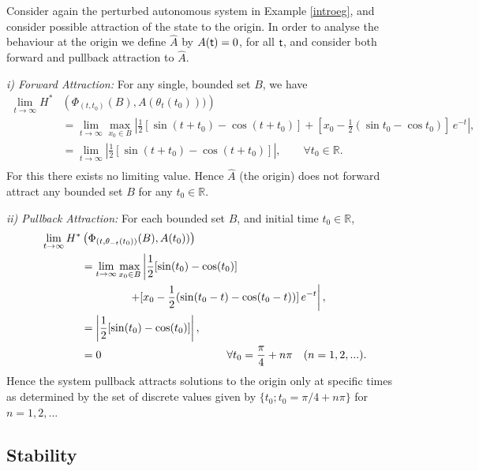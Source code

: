 \begin{example}
Consider again the perturbed autonomous system in Example
\ref{introeg}, and consider possible attraction of the state to
the origin. In order to analyse the behaviour at the origin we
define $\hat{A}$ by $A( \mathsf{\mathsf{t}}) = 0$, for all $ \mathsf{\mathsf{t}}$, and consider both
forward and pullback attraction to $\hat{A}$.

{\em i) Forward Attraction:} For any single, bounded set $B$, we
have
\begin{align*}
  \lim_{t \to \infty} H^{*} &\left(\Phi_{(t,t_0)}(B),A(\theta_t (t_0)))
        \right) \\
  &= \lim_{t \to \infty} \max_{x_0 \in B} \left|
        \frac{1}{2} [ \sin (t+t_0) - \cos (t+t_0) ] + [
        x_0 - \frac{1}{2} ( \sin t_0 - \cos t_0 )] \,
        e^{-t} \right|, \\
  &= \lim_{t \to \infty} \left| \frac{1}{2} [\sin (t+t_0) -
        \cos (t+t_0) ] \right|,  \qquad \forall
        t_0 \in \mathbb{R}. \\
\end{align*}
For this there exists no limiting value. Hence $\hat{A}$ (the
origin) does not forward attract any bounded set $B$ for any $t_0
\in \mathbb{R}$.

{\em ii) Pullback Attraction:} For each bounded set $B$, and
initial time $t_0 \in \mathbb{R}$,
\begin{align*}
  \lim_{t \to \infty} H^{*} &\left(\Phi_{(t,\theta_{-t}(t_0))}
        (B),A(t_0)) \right) \\
  &= \lim_{t \to \infty} \max_{x_0 \in B} \left|
        \frac{1}{2} [\sin (t_0) - \cos (t_0)] \right. \\
  & \hspace{1.5cm} \left. + [ x_0 -
        \frac{1}{2} (\sin (t_0-t) - \cos (t_0-t) )] \,
        e^{-t} \right| , \\
  &= \left| \frac{1}{2} [\sin (t_0) - \cos (t_0)] \right|, \\
  &= 0 \hspace{4cm} \forall t_0 = \frac{\pi}{4} + n \pi \quad (n =
        1,2,...).\\
\end{align*}
Hence the system pullback attracts solutions to the origin only at
specific times as determined by the set of discrete values given
by $\{t_0; t_0 = \pi/4 + n\pi \}$ for $n = 1, 2, ..$.
\end{example}

\subsection{Stability}

